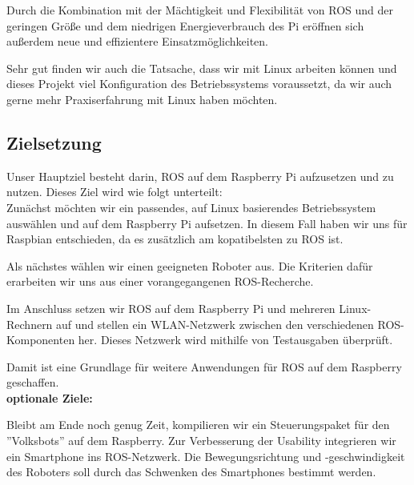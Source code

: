 \documentclass[12pt]{article}
\begin{document}
Durch die Kombination mit der Mächtigkeit und Flexibilität von ROS und der geringen Größe und dem niedrigen Energieverbrauch des Pi eröffnen sich außerdem neue und effizientere Einsatzmöglichkeiten.

Sehr gut finden wir auch die Tatsache, dass wir mit Linux arbeiten können und dieses Projekt viel Konfiguration des Betriebssystems voraussetzt, da wir auch gerne mehr Praxiserfahrung mit Linux haben möchten.








\subsection{Zielsetzung}


Unser Hauptziel besteht darin, ROS auf dem Raspberry Pi aufzusetzen und zu nutzen. Dieses Ziel wird wie folgt unterteilt:\\

Zunächst möchten wir ein passendes, auf Linux basierendes Betriebssystem auswählen und auf dem Raspberry Pi aufsetzen. In diesem Fall haben wir uns für Raspbian entschieden, da es zusätzlich am kopatibelsten zu ROS ist.

Als nächstes wählen wir einen geeigneten Roboter aus. Die Kriterien dafür erarbeiten wir uns aus einer vorangegangenen ROS-Recherche.

Im Anschluss setzen wir ROS auf dem Raspberry Pi und mehreren Linux-Rechnern auf und stellen ein WLAN-Netzwerk zwischen den verschiedenen ROS-Komponenten her.
Dieses Netzwerk wird mithilfe von Testausgaben überprüft.

Damit ist eine Grundlage für weitere Anwendungen für ROS auf dem Raspberry geschaffen.\\

{\bf{ optionale Ziele:}}

Bleibt am Ende noch genug Zeit, kompilieren wir ein Steuerungspaket für den ''Volksbots'' auf dem Raspberry. Zur Verbesserung der Usability integrieren wir ein Smartphone ins ROS-Netzwerk. Die Bewegungsrichtung und -geschwindigkeit des Roboters soll durch das Schwenken des Smartphones bestimmt werden.
\end{document}
